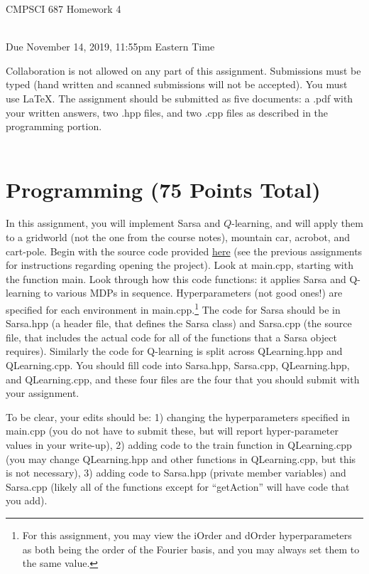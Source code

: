 \documentclass[]{article}
\begin{document}
\begin{center}
    \begin{Large}
    CMPSCI 687 Homework 4
    \end{Large}
    \\
    Due November 14, 2019, 11:55pm Eastern Time
\end{center}

 Collaboration is not allowed on any part of this assignment. Submissions must be typed (hand written and scanned submissions will not be accepted). You must use \LaTeX. The assignment should be submitted as five documents: a .pdf with your written answers, two .hpp files, and two .cpp files as described in the programming portion.
\\\\
\section*{Programming (75 Points Total)}

In this assignment, you will implement Sarsa and $Q$-learning, and will apply them to a gridworld (not the one from the course notes), mountain car, acrobot, and cart-pole. Begin with the source code provided \href{https://people.cs.umass.edu/~pthomas/courses/CMPSCI_687_Fall2019/HW4Source.zip}{here} (see the previous assignments for instructions regarding opening the project). Look at main.cpp, starting with the function main. Look through how this code functions: it applies Sarsa and Q-learning to various MDPs in sequence. Hyperparameters (not good ones!) are specified for each environment in main.cpp.\footnote{For this assignment, you may view the iOrder and dOrder hyperparameters as both being the order of the Fourier basis, and you may always set them to the same value.} The code for Sarsa should be in Sarsa.hpp (a header file, that defines the Sarsa class) and Sarsa.cpp (the source file, that includes the actual code for all of the functions that a Sarsa object requires). Similarly the code for Q-learning is split across QLearning.hpp and QLearning.cpp. You should fill code into Sarsa.hpp, Sarsa.cpp, QLearning.hpp, and QLearning.cpp, and these four files are the four that you should submit with your assignment.

To be clear, your edits should be: 1) changing the hyperparameters specified in main.cpp (you do not have to submit these, but will report hyper-parameter values in your write-up), 2) adding code to the train function in QLearning.cpp (you may change QLearning.hpp and other functions in QLearning.cpp, but this is not necessary), 3) adding code to Sarsa.hpp (private member variables) and Sarsa.cpp (likely all of the functions except for ``getAction'' will have code that you add).
\end{document}
